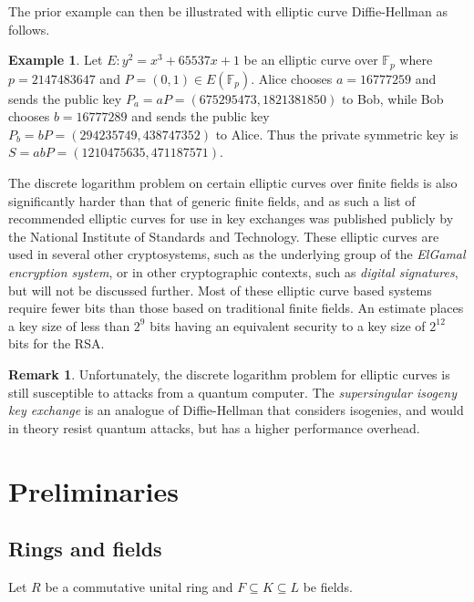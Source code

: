 \documentclass{article}
\newcommand{\F}{\mathbb{F}}
\newcommand{\rb}[1]{\left( #1 \right)}
\theoremstyle{definition}\newtheorem*{definition}{Definition}
\theoremstyle{definition}\newtheorem*{example}{Example}
\theoremstyle{definition}\newtheorem*{remark}{Remark}
\begin{document}
The prior example can then be illustrated with elliptic curve Diffie-Hellman as follows.

\begin{example}
Let $ E : y^2 = x^3 + 65537x + 1 $ be an elliptic curve over $ \F_p $ where $ p = 2147483647 $ and $ P = \rb{0, 1} \in E\rb{\F_p} $. Alice chooses $ a = 16777259 $ and sends the public key $ P_a = aP = \rb{675295473, 1821381850} $ to Bob, while Bob chooses $ b = 16777289 $ and sends the public key $ P_b = bP = \rb{294235749, 438747352} $ to Alice. Thus the private symmetric key is $ S = abP = \rb{1210475635, 471187571} $.
\end{example}

The discrete logarithm problem on certain elliptic curves over finite fields is also significantly harder than that of generic finite fields, and as such a list of recommended elliptic curves for use in key exchanges was published publicly by the National Institute of Standards and Technology. These elliptic curves are used in several other cryptosystems, such as the underlying group of the \emph{ElGamal encryption system}, or in other cryptographic contexts, such as \emph{digital signatures}, but will not be discussed further. Most of these elliptic curve based systems require fewer bits than those based on traditional finite fields. An estimate places a key size of less than $ 2^9 $ bits having an equivalent security to a key size of $ 2^{12} $ bits for the RSA.

\begin{remark}
Unfortunately, the discrete logarithm problem for elliptic curves is still susceptible to attacks from a quantum computer. The \emph{supersingular isogeny key exchange} is an analogue of Diffie-Hellman that considers isogenies, and would in theory resist quantum attacks, but has a higher performance overhead.
\end{remark}

\pagebreak

\appendix

\section{Preliminaries}

\subsection{Rings and fields}

Let $ R $ be a commutative unital ring and $ F \subseteq K \subseteq L $ be fields.
\end{document}
